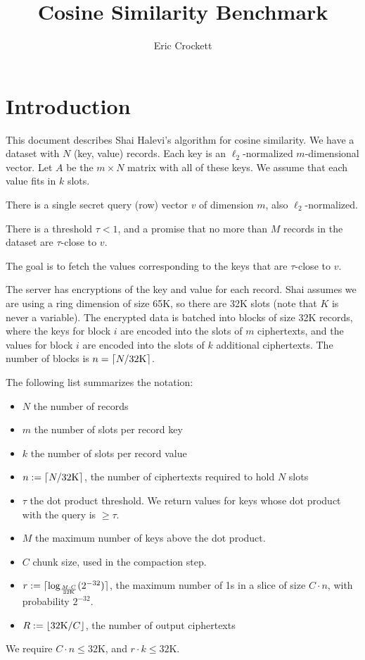 \documentclass{article}
\begin{document}
	\title{Cosine Similarity Benchmark}
	\author{Eric Crockett}
	\maketitle
	
	\listoffixmes
	
	\section{Introduction}
	This document describes Shai Halevi's algorithm for cosine similarity. We have a dataset with $N$ (key, value) records. Each key is an $\ell_2$-normalized $m$-dimensional vector. Let $A$ be the $m\times N$ matrix with all of these keys. We assume that each value fits in $k$ slots.
	
	There is a single secret query (row) vector $v$ of dimension $m$, also $\ell_2$-normalized.
	
	There is a threshold $\tau<1$, and a promise that no more than $M$ records in the dataset are $\tau$-close to $v$.
	
	The goal is to fetch the values corresponding to the keys that are $\tau$-close to $v$.
	
	The server has encryptions of the key and value for each record.
	Shai assumes we are using a ring dimension of size 65K, so there are 32K slots (note that $K$ is never a variable). The encrypted data is batched into blocks of size 32K records, where the keys for block $i$ are encoded into the slots of $m$ ciphertexts, and the values for block $i$ are encoded into the slots of $k$ additional ciphertexts. The number of blocks is $n=\lceil N/32\mathrm{K}\rceil$.
		
	The following list summarizes the notation:
	\begin{itemize}
		\item $N$ the number of records
		\item $m$ the number of slots per record key
		\item $k$ the number of slots per record value
		\item $n:=\lceil N/32\mathrm{K}\rceil$, the number of ciphertexts required to hold $N$ slots
		\item $\tau$ the dot product threshold. We return values for keys whose dot product with the query is $\ge\tau$.
		\item $M$ the maximum number of keys above the dot product.
		\item $C$ chunk size, used in the compaction step.
		\item $r:=\lceil\log_{\frac{M\cdot C}{32\mathrm{K}}}(2^{-32})\rceil$, the maximum number of 1s in a slice of size $C\cdot n$, with probability $2^{-32}$.
		\item $R:=\lfloor32\mathrm{K}/C\rfloor$, the number of output ciphertexts
	\end{itemize}
	We require $C\cdot n\le 32\mathrm{K}$, and $r\cdot k\le 32\mathrm{K}$. 
	
\end{document}
